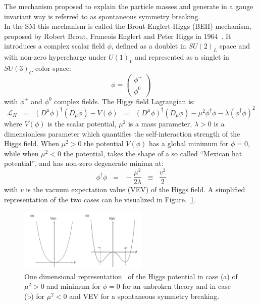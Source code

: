 The mechanism proposed to explain the particle masses and generate in a gauge invariant way is referred to as spontaneous symmetry breaking.\\
In the SM this mechanism is called the Brout-Englert-Higgs (BEH) mechanism, proposed by Robert Brout, Francois Englert and Peter Higgs in 1964~\cite{PhysRevLett.13.321,PhysRevLett.13.508}. It introduces a complex scalar field $\phi$, defined as a doublet in $SU(2)_{L}$ space and with non-zero hypercharge under $U(1)_Y$ and represented as a singlet in $SU(3)_{C}$ color space:
\begin{equation}
\label{eq:higgsphi}
\phi = \begin{pmatrix}
\phi^+\\
\phi^0
\end{pmatrix}
\end{equation}
with $\phi^+$ and $\phi^0$ complex fields. The Higgs field Lagrangian is:
\begin{equation}
\label{eq:higgsL}
 \mathcal{L}_{H} \;\; = \;\; (D^{\mu}\phi)^\dag (D_{\mu}\phi) - V(\phi) \;\; = \;\; (D^{\mu}\phi)^\dag (D_{\mu}\phi) - \mu^2\phi^\dag \phi - \lambda(\phi^\dag \phi)^2
\end{equation}
where $V(\phi)$ is the scalar potential, $\mu^2$ is a mass parameter, $\lambda > 0$ is a dimensionless parameter which quantifies the self-interaction strength of the Higgs field. When $\mu^2 > 0$ the potential $V(\phi)$ has a global minimum for $\phi = 0$, while when $\mu^2 < 0$ the potential, takes the shape of a so called ``Mexican hat potential'', and has non-zero degenerate minima at:
\begin{equation}
\label{eq:higgsM}
\phi^\dag \phi \;\; = \;\; - \frac{\mu^2}{2\lambda} \;\; \equiv \;\; \frac{v^2}{2}
\end{equation}
with $v$ is the vacuum expectation value (VEV) of the Higgs field. A simplified representation of the two cases can be visualized in Figure.~\ref{fig:mexico}.

\begin{figure}[h]
\centering
\includegraphics[width=0.55\textwidth]{Figures/c1/higgsPotential}
\caption{One dimensional representation~\cite{thomson_2013} of the Higgs potential in case (a) of $\mu^2 > 0$ and minimum for $\phi = 0$ for an unbroken theory and in case (b) for $\mu^2 < 0$ and VEV for a spontaneous symmetry breaking.}
\label{fig:mexico}
\end{figure}

